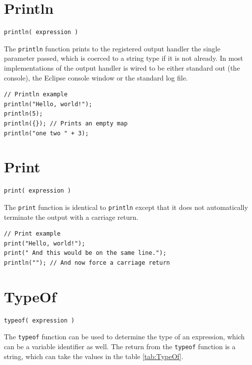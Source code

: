 \section{Println}
\begin{verbatim}
println( expression )
\end{verbatim}

The \verb+println+ function prints to the registered output handler the single parameter passed, which is coerced to a string type if it is not already. In most implementations of \Reflex the output handler is wired to be either standard out (the console), the Eclipse console window or the standard log file.
\begin{lstlisting}[caption={println}]
// Println example
println("Hello, world!");
println(5);
println({}); // Prints an empty map
println("one two " + 3);
\end{lstlisting}

\section{Print}
\begin{verbatim}
print( expression )
\end{verbatim}

The \verb+print+ function is identical to \verb+println+ except that it does not automatically terminate the output with a carriage return.
\begin{lstlisting}[caption={print}]
// Print example
print("Hello, world!");
print(" And this would be on the same line.");
println(""); // And now force a carriage return
\end{lstlisting}

\section{TypeOf}

\begin{verbatim}
typeof( expression )
\end{verbatim}

The \verb+typeof+ function can be used to determine the type of an expression, which can be a variable identifier as well. The return from the \verb+typeof+ function is a string, which can take the values in the table \vref{tab:TypeOf}.

